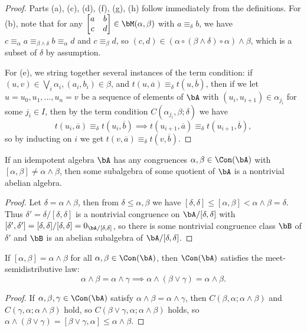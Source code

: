 \begin{proof} Parts (a), (c), (d), (f), (g), (h) follow immediately from the definitions. For (b), note that for any $\begin{bmatrix} a & b\\ c & d\end{bmatrix} \in \bM(\alpha,\beta)$ with $a \equiv_\delta b$, we have $c \equiv_\alpha a \equiv_{\beta \wedge \delta} b \equiv_\alpha d$ and $c \equiv_\beta d$, so $(c,d) \in (\alpha \circ (\beta \wedge \delta) \circ \alpha) \wedge \beta$, which is a subset of $\delta$ by assumption.

For (e), we string together several instances of the term condition: if $(u,v) \in \bigvee_i \alpha_i, (a_i,b_i) \in \beta$, and $t(u,\overline{a}) \equiv_\delta t(u,\overline{b})$, then if we let $u = u_0, u_1, ..., u_n = v$ be a sequence of elements of $\bA$ with $(u_i, u_{i+1}) \in \alpha_{j_i}$ for some $j_i \in I$, then by the term condition $C(\alpha_{j_i},\beta;\delta)$ we have
\[
t(u_i,\overline{a})\equiv_\delta t(u_i,\overline{b}) \implies t(u_{i+1},\overline{a})\equiv_\delta t(u_{i+1},\overline{b}),
\]
so by inducting on $i$ we get $t(v,\overline{a}) \equiv_\delta t(v,\overline{b})$.
\end{proof}

\begin{cor} If an idempotent algebra $\bA$ has any congruences $\alpha, \beta \in \Con(\bA)$ with $[\alpha,\beta] \ne \alpha \wedge \beta$, then some subalgebra of some quotient of $\bA$ is a nontrivial abelian algebra.
\end{cor}
\begin{proof} Let $\delta = \alpha \wedge \beta$, then from $\delta \le \alpha, \beta$ we have $[\delta,\delta] \le [\alpha,\beta] < \alpha\wedge \beta = \delta$. Thus $\delta' = \delta/[\delta,\delta]$ is a nontrivial congruence on $\bA/[\delta,\delta]$ with $[\delta',\delta'] = [\delta,\delta]/[\delta,\delta] = 0_{\bA/[\delta,\delta]}$, so there is some nontrivial congruence class $\bB$ of $\delta'$ and $\bB$ is an abelian subalgebra of $\bA/[\delta,\delta]$.
\end{proof}

\begin{prop}\label{sd-meet-commutator} If $[\alpha,\beta] = \alpha \wedge \beta$ for all $\alpha, \beta \in \Con(\bA)$, then $\Con(\bA)$ satisfies the meet-semidistributive law:
\[
\alpha \wedge \beta = \alpha\wedge \gamma \implies \alpha \wedge (\beta \vee \gamma) = \alpha \wedge \beta.
\]
\end{prop}
\begin{proof} If $\alpha,\beta,\gamma \in \Con(\bA)$ satisfy $\alpha \wedge \beta = \alpha \wedge \gamma$, then $C(\beta,\alpha;\alpha \wedge \beta)$ and $C(\gamma,\alpha;\alpha\wedge \beta)$ hold, so $C(\beta\vee \gamma,\alpha;\alpha\wedge \beta)$ holds, so $\alpha \wedge (\beta\vee \gamma) = [\beta\vee \gamma,\alpha] \le \alpha\wedge \beta$.
\end{proof}

